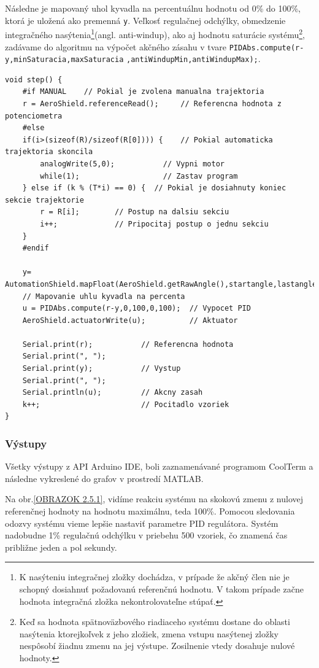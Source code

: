 Následne je mapovaný uhol kyvadla na percentuálnu hodnotu od 0\% do 100\%, ktorá je uložená ako premenná \verb|y|. Veľkosť regulačnej odchýlky, obmedzenie integračného nasýtenia\footnote[9]{K nasýteniu integračnej zložky dochádza, v prípade že akčný člen nie je schopný dosiahnuť požadovanú referenčnú
	hodnotu. V takom prípade začne hodnota integračná zložka nekontrolovateľne stúpať.}(angl. anti-windup), ako aj hodnotu saturácie systému\footnote[10]{Keď sa hodnota spätnoväzbového riadiaceho systému dostane do oblasti nasýtenia ktorejkoľvek z jeho zložiek, zmena vstupu nasýtenej zložky nespôsobí žiadnu zmenu na jej výstupe. Zosilnenie vtedy dosahuje nulové hodnoty.}, zadávame do algoritmu na výpočet akčného zásahu v tvare \verb|PIDAbs.compute(r-y,minSaturacia,maxSaturacia|
\verb|,antiWindupMin,antiWindupMax);|. 


\begin{lstlisting}[caption={Funkcia step().},captionpos=b]
void step() {            
	#if MANUAL    // Pokial je zvolena manualna trajektoria 
	r = AeroShield.referenceRead();     // Referencna hodnota z potenciometra
	#else         
	if(i>(sizeof(R)/sizeof(R[0]))) {    // Pokial automaticka trajektoria skoncila
		analogWrite(5,0);           // Vypni motor
		while(1);                   // Zastav program
	} else if (k % (T*i) == 0) {  // Pokial je dosiahnuty koniec       sekcie trajektorie
		r = R[i];        // Postup na dalsiu sekciu
		i++;             // Pripocitaj postup o jednu sekciu 
	}
	#endif
	
    y= AutomationShield.mapFloat(AeroShield.getRawAngle(),startangle,lastangle,0.00,100.00);
	// Mapovanie uhlu kyvadla na percenta 
	u = PIDAbs.compute(r-y,0,100,0,100);  // Vypocet PID 
	AeroShield.actuatorWrite(u);          // Aktuator
	
	Serial.print(r);           // Referencna hodnota 
	Serial.print(", ");
	Serial.print(y);           // Vystup 
	Serial.print(", ");
	Serial.println(u);         // Akcny zasah 
	k++;                       // Pocitadlo vzoriek 
}
\end{lstlisting}

\subsubsection{Výstupy}

Všetky výstupy z API Arduino IDE, boli zaznamenávané programom CoolTerm a následne vykreslené do grafov v prostredí MATLAB. 

Na obr.\ref{OBRAZOK 2.5.1}, vidíme reakciu systému na skokovú zmenu z nulovej referenčnej hodnoty na hodnotu maximálnu, teda 100\%. Pomocou sledovania odozvy systému vieme lepšie nastaviť parametre PID regulátora. Systém nadobudne 1\% regulačnú odchýlku v priebehu 500 vzoriek, čo znamená čas približne jeden a pol sekundy. 

